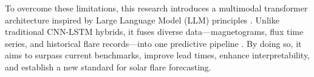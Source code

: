To overcome these limitations, this research introduces a multimodal transformer architecture inspired by Large Language Model (LLM) principles \citep{RefWorks:RefID:3-vaswani2023provided}. Unlike traditional CNN-LSTM hybrids, it fuses diverse data—magnetograms, flux time series, and historical flare records—into one predictive pipeline \citep{RefWorks:RefID:2-abduallah2023operational, RefWorks:RefID:30-schmude2024prithvi}. By doing so, it aims to surpass current benchmarks, improve lead times, enhance interpretability, and establish a new standard for solar flare forecasting.